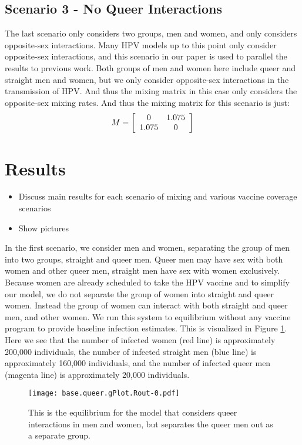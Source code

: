 \documentclass[12pt]{article}
\begin{document}
\subsection{Scenario 3 - No Queer Interactions}
The last scenario only considers two groups, men and women, and only considers opposite-sex interactions.  Many HPV models up to this point only consider opposite-sex interactions, and this scenario in our paper is used to parallel the results to previous work.  Both groups of men and women here include queer and straight men and women, but we only consider opposite-sex interactions in the transmission of HPV. And thus the mixing matrix in this case only considers the opposite-sex mixing rates.  And thus the mixing matrix for this scenario is just:
\begin{equation}
M=\left[\begin{array}{c c}
0 & 1.075 \\
1.075 & 0
\end{array}\right]
\end{equation}
\section{Results}
\begin{itemize}
\item Discuss main results for each scenario of mixing and various vaccine coverage scenarios
\item Show pictures
\end{itemize}

In the first scenario, we consider men and women, separating the group of men into two groups, straight and queer men.  Queer men may have sex with both women and other queer men, straight men have sex with women exclusively.  Because women are already scheduled to take the HPV vaccine and to simplify our model, we do not separate the group of women into straight and queer women. Instead the group of women can interact with both straight and queer men, and other women. We run this system to equilibrium without any vaccine program to provide baseline infection estimates.  This is visualized in Figure \ref{fig:QueerNoVacc}.  Here we see that the number of infected women (red line) is approximately 200,000 individuals, the number of infected straight men (blue line) is approximately 160,000 individuals, and the number of infected queer men (magenta line) is approximately 20,000 individuals.  

\begin{figure}[h!]
\begin{center}
\texttt{[image: base.queer.gPlot.Rout-0.pdf]}
\caption{This is the equilibrium for the model that considers queer interactions in men and women, but separates the queer men out as a separate group.}
\label{fig:QueerNoVacc}
\end{center}
\end{figure}
\end{document}
